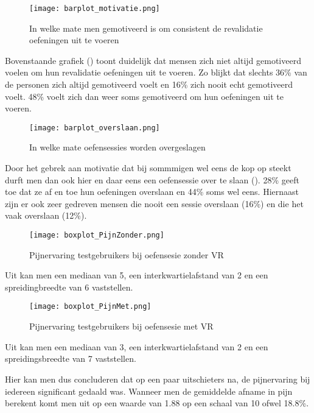 \begin{figure}[h]
    \centering
    \texttt{[image: barplot\_motivatie.png]}
    \caption{In welke mate men gemotiveerd is om consistent de revalidatie oefeningen uit te voeren}
    \label{figuur 6.3}
\end{figure}

Bovenstaande grafiek (\cite{figuur 6.3}) toont duidelijk dat mensen zich niet altijd gemotiveerd voelen om hun revalidatie oefeningen uit te voeren. Zo blijkt dat slechts 36\% van de personen zich altijd gemotiveerd voelt en 16\% zich nooit echt gemotiveerd voelt. 48\% voelt zich dan weer soms gemotiveerd om hun oefeningen uit te voeren.

\begin{figure}[h]
    \centering
    \texttt{[image: barplot\_overslaan.png]}
    \caption{In welke mate oefensessies worden overgeslagen}
    \label{figuur 6.4}
\end{figure}

Door het gebrek aan motivatie dat bij sommmigen wel eens de kop op steekt durft men dan ook hier en daar eens een oefensessie over te slaan (\cite{figuur 6.4}). 28\% geeft toe dat ze af en toe hun oefeningen overslaan en 44\% soms wel eens. Hiernaast zijn er ook zeer gedreven mensen die nooit een sessie overslaan (16\%) en die het vaak overslaan (12\%).

\begin{figure}[h]
    \centering
    \texttt{[image: boxplot\_PijnZonder.png]}
    \caption{Pijnervaring testgebruikers bij oefensesie zonder VR}
    \label{figuur 6.5}
\end{figure}

Uit \cite{figuur 6.5} kan men een mediaan van 5, een interkwartielafstand van 2 en een spreidingbreedte van 6 vaststellen.

\begin{figure}[h]
    \centering
    \texttt{[image: boxplot\_PijnMet.png]}
    \caption{Pijnervaring testgebruikers bij oefensesie met VR}
    \label{figuur 6.6}
\end{figure}

Uit \cite{figuur 6.6} kan men een mediaan van 3, een interkwartielafstand van 2 en een spreidingsbreedte van 7 vaststellen.

Hier kan men dus concluderen dat op een paar uitschieters na, de pijnervaring bij iedereen significant gedaald was. Wanneer men de gemiddelde afname in pijn berekent komt men uit op een waarde van 1.88 op een schaal van 10 ofwel 18.8\%.

